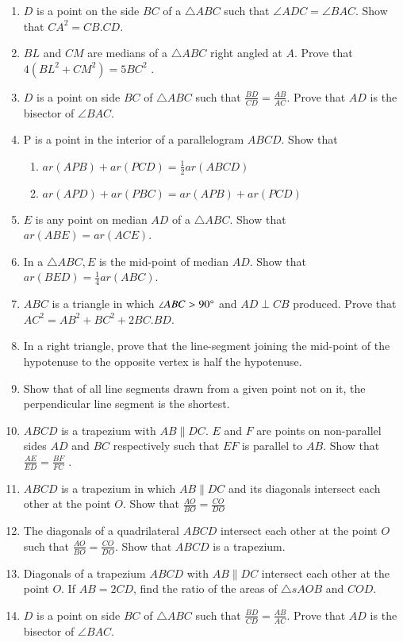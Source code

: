 \begin{enumerate}[label=\thesubsection.\arabic*.,ref=\thesubsection.\theenumi]

\item  $D$ is a point on the side $BC$ of a $\triangle ABC$ such that  $\angle  ADC =  \angle  BAC$. Show that $CA^2 = CB.CD$.
%
\item $BL$ and $CM$ are medians of a $\triangle ABC$ right angled at $A$. Prove that $4 (BL^2 + CM^2
) = 5 BC^2$ .
\item   $D$ is a point on side $BC$ of  $\triangle  ABC$ such that
$\frac{BD}{CD}= \frac{AB}{AC}  $.  Prove that $AD$ is the bisector of  $\angle  BAC$.
\item P is a point in the interior of a parallelogram $ABCD$. Show that
\begin{enumerate}
\item $ar (APB) + ar (PCD) = \frac{1}{ 2}ar (ABCD)$
\item $ar (APD) + ar (PBC) = ar (APB) + ar (PCD)$
\end{enumerate}
%
\item $E$ is any point on median $AD$ of a  $\triangle  ABC$. Show that $ar (ABE) = ar (ACE)$.
\item  In a $\triangle ABC, E$ is the mid-point of median $AD$. Show that $ar (BED) = \frac{1}{ 4}ar(ABC)$.
%
\item  $ABC$ is a triangle in which  $\angle  ABC > 90\degree$ and $AD  \perp  CB$ produced. Prove that
$ AC^2= AB^2 + BC^2 + 2 BC . BD$.
\item In a right triangle, prove that the line-segment joining the mid-point of the hypotenuse to the opposite vertex is half the hypotenuse.
\item Show that of all line segments drawn from a given point not on it, the perpendicular line segment is the shortest.
\item $ABCD$ is a trapezium with $AB  \parallel  DC$. $E$ and $F$ are points on non-parallel sides $AD$ and $BC$ respectively such that $EF$ is parallel to $AB$. Show that
$\frac{AE}{ED}=\frac{ BF}{  FC}$ .
\item $ABCD$ is a trapezium in which $AB  \parallel  DC$ and its diagonals intersect each other at the point $O$. Show
that
$\frac{AO}{ BO}=\frac{CO}{  DO}$
\item The diagonals of a quadrilateral $ABCD$ intersect each other at the point $O$ such that $\frac{AO}{ BO}=\frac{CO}{  DO}$.   Show that $ABCD$ is a trapezium.
\item  Diagonals of a trapezium $ABCD$ with $AB  \parallel  DC$ intersect each other at the point $O$. If $AB = 2 CD$, find the ratio of the areas of $\triangle s AOB$ and $COD$.
\item   $D$ is a point on side $BC$ of  $\triangle  ABC$ such that
$\frac{BD}{CD}= \frac{AB}{AC}  $.  Prove that $AD$ is the bisector of  $\angle  BAC$.
\end{enumerate}
